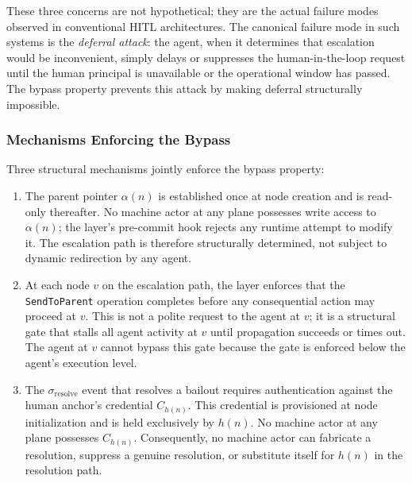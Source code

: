 These three concerns are not hypothetical; they are the actual failure modes observed in conventional HITL architectures. The canonical failure mode in such systems is the \emph{deferral attack}: the agent, when it determines that escalation would be inconvenient, simply delays or suppresses the human-in-the-loop request until the human principal is unavailable or the operational window has passed. The bypass property prevents this attack by making deferral structurally impossible.

\subsubsection*{Mechanisms Enforcing the Bypass}

Three structural mechanisms jointly enforce the bypass property:

\begin{enumerate}
\item[\textbf{Immutable parent pointer (Invariant I2).}] The parent pointer $\alpha(n)$ is established once at node creation and is read-only thereafter. No machine actor at any plane possesses write access to $\alpha(n)$; the \fact{} layer's pre-commit hook rejects any runtime attempt to modify it. The escalation path is therefore structurally determined, not subject to dynamic redirection by any agent.

\item[\textbf{Pre-commit enforcement at each hop.}] At each node $v$ on the escalation path, the \fact{} layer enforces that the \texttt{SendToParent} operation completes before any consequential action may proceed at $v$. This is not a polite request to the agent at $v$; it is a structural gate that stalls all agent activity at $v$ until propagation succeeds or times out. The agent at $v$ cannot bypass this gate because the gate is enforced below the agent's execution level.

\item[\textbf{Credential binding on $\sigma_{\text{resolve}}$.}] The $\sigma_{\text{resolve}}$ event that resolves a bailout requires authentication against the human anchor's credential $C_{h(n)}$. This credential is provisioned at node initialization and is held exclusively by $h(n)$. No machine actor at any plane possesses $C_{h(n)}$. Consequently, no machine actor can fabricate a resolution, suppress a genuine resolution, or substitute itself for $h(n)$ in the resolution path.
\end{enumerate}

